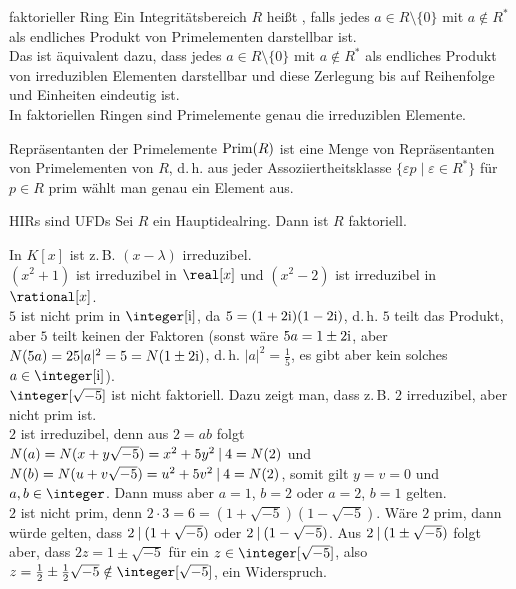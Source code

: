 \begin{Def}{faktorieller Ring}
    Ein Integritätsbereich $R$ heißt ,
    falls jedes $a \in R \setminus \{0\}$ mit $a \notin R^\ast$
    als endliches Produkt von Primelementen darstellbar ist.\\
    Das ist äquivalent dazu, dass
    jedes $a \in R \setminus \{0\}$ mit $a \notin R^\ast$
    als endliches Produkt von irreduziblen Elementen darstellbar
    und diese Zerlegung bis auf Reihenfolge und Einheiten eindeutig ist.\\
    In faktoriellen Ringen sind Primelemente genau die irreduziblen Elemente.
\end{Def}

\begin{Def}{Repräsentanten der Primelemente}
    $\operatorname{Prim}(R)$ ist eine Menge von Repräsentanten von Primelementen von $R$,
    d.\,h. aus jeder Assoziiertheitsklasse
    $\{\varepsilon p \;|\; \varepsilon \in R^\ast\}$ für $p \in R$ prim
    wählt man genau ein Element aus.
\end{Def}

\begin{Theorem}{HIRs sind UFDs}
    Sei $R$ ein Hauptidealring.
    Dann ist $R$ faktoriell.
\end{Theorem}

\linie
\pagebreak

\begin{Bsp}
    In $K[x]$ ist z.\,B. $(x - \lambda)$ irreduzibel.\\
    $(x^2 + 1)$ ist irreduzibel in $\real[x]$ und
    $(x^2 - 2)$ ist irreduzibel in $\rational[x]$.\\
    $5$ ist nicht prim in $\integer[\i]$, da
    $5 = (1 + 2\text{i})(1 - 2\text{i})$, d.\,h.
    $5$ teilt das Produkt, aber $5$ teilt keinen der Faktoren
    (sonst wäre $5a = 1 \pm 2\text{i}$, aber
    $N(5a) = 25 |a|^2 = 5 = N(1 \pm 2\text{i})$, d.\,h.
    $|a|^2 = \frac{1}{5}$, es gibt aber kein solches $a \in \integer[\i]$).\\
    $\integer[\sqrt{-5}]$ ist nicht faktoriell.
    Dazu zeigt man, dass z.\,B. $2$ irreduzibel, aber nicht prim ist.\\
    $2$ ist irreduzibel, denn aus $2 = ab$ folgt
    $N(a) = N(x + y\sqrt{-5}) = x^2 + 5y^2 \mathbin{|} 4 = N(2)$ und
    $N(b) = N(u + v\sqrt{-5}) = u^2 + 5v^2 \mathbin{|} 4 = N(2)$,
    somit gilt $y = v = 0$ und $a, b \in \integer$.
    Dann muss aber $a = 1$, $b = 2$ oder $a = 2$, $b = 1$ gelten.\\
    $2$ ist nicht prim, denn $2 \cdot 3 = 6 = (1 + \sqrt{-5})(1 - \sqrt{-5})$.
    Wäre $2$ prim, dann würde gelten, dass $2 \mathbin{|} (1 + \sqrt{-5})$ oder
    $2 \mathbin{|} (1 - \sqrt{-5})$.
    Aus $2 \mathbin{|} (1 \pm \sqrt{-5})$ folgt aber, dass
    $2z = 1 \pm \sqrt{-5}$ für ein $z \in \integer[\sqrt{-5}]$, also
    $z = \frac{1}{2} \pm \frac{1}{2} \sqrt{-5} \notin \integer[\sqrt{-5}]$,
    ein Widerspruch.
\end{Bsp}

